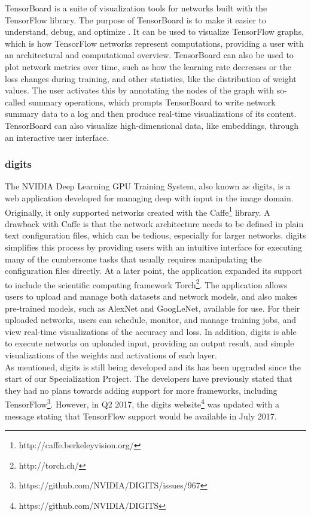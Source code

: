 TensorBoard is a suite of visualization tools for networks built with the TensorFlow library. The purpose of TensorBoard is to make it easier to understand, debug, and optimize . It can be used to visualize TensorFlow graphs, which is how TensorFlow networks represent computations, providing a user with an architectural and computational overview. TensorBoard can also be used to plot network metrics over time, such as how the learning rate decreases or the loss changes during training, and other statistics, like the distribution of weight values. The user activates this by annotating the nodes of the graph with so-called summary operations, which prompts TensorBoard to write network summary data to a log and then produce real-time visualizations of its content. TensorBoard can also visualize high-dimensional data, like embeddings, through an interactive user interface.

\subsubsection{\acrshort{digits}}

The NVIDIA Deep Learning GPU Training System, also known as \acrshort{digits}, is a web application developed for managing deep  with input in the image domain. Originally, it only supported networks created with the Caffe\footnote{http://caffe.berkeleyvision.org/} library. A drawback with Caffe is that the network architecture needs to be defined in plain text configuration files, which can be tedious, especially for larger networks. \acrshort{digits} simplifies this process by providing users with an intuitive interface for executing many of the cumbersome tasks that usually requires manipulating the configuration files directly. At a later point, the application expanded its support to include the scientific computing framework Torch\footnote{http://torch.ch/}. The application allows users to upload and manage both datasets and network models, and also makes pre-trained models, such as AlexNet and GoogLeNet, available for use. For their uploaded networks, users can schedule, monitor, and manage training jobs, and view real-time visualizations of the accuracy and loss. In addition, \acrshort{digits} is able to execute networks on uploaded input, providing an output result, and simple visualizations of the weights and activations of each layer. \\

\noindent As mentioned, \acrshort{digits} is still being developed and its has been upgraded since the start of our Specialization Project. The developers have previously stated that they had no plans towards adding support for more frameworks, including TensorFlow\footnote{https://github.com/NVIDIA/DIGITS/issues/967}. However, in Q2 2017, the \acrshort{digits} website\footnote{https://github.com/NVIDIA/DIGITS} was updated with a message stating that TensorFlow support would be available in July 2017.

